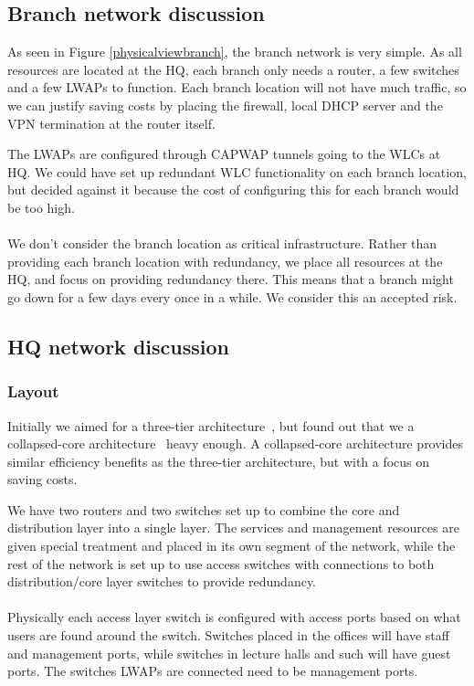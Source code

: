 \subsection{Branch network discussion}


As seen in Figure \ref{physicalviewbranch}, the branch network is very simple. As all resources are located at the HQ, each branch only needs a router, a few switches and a few LWAPs to function. Each branch location will not have much traffic, so we can justify saving costs by placing the firewall, local DHCP server and the VPN termination at the router itself.

The LWAPs are configured through CAPWAP tunnels going to the WLCs at HQ. We could have set up redundant WLC functionality on each branch location, but decided against it because the cost of configuring this for each branch would be too high.
\\
\\
We don't consider the branch location as critical infrastructure. Rather than providing each branch location with redundancy, we place all resources at the HQ, and focus on providing redundancy there. This means that a branch might go down for a few days every once in a while. We consider this an accepted risk.

\subsection{HQ network discussion}

\subsubsection{Layout}

Initially we aimed for a three-tier architecture~\cite{todo}, but found out that we a collapsed-core architecture~\cite{todo} heavy enough. A collapsed-core architecture provides similar efficiency benefits as the three-tier architecture, but with a focus on saving costs.

We have two routers and two switches set up to combine the core and distribution layer into a single layer. The services and management resources are given special treatment and placed in its own segment of the network, while the rest of the network is set up to use access switches with connections to both distribution/core layer switches to provide redundancy.
\\
\\
Physically each access layer switch is configured with access ports based on what users are found around the switch. Switches placed in the offices will have staff and management ports, while switches in lecture halls and such will have guest ports. The switches LWAPs are connected need to be management ports. 

